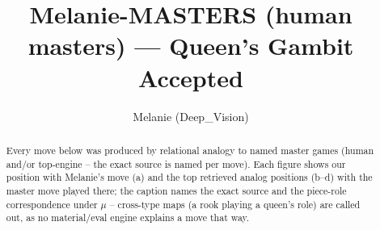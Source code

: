 \documentclass[11pt]{article}
\title{Melanie-MASTERS (human masters) — Queen's Gambit Accepted}
\author{Melanie (Deep\_Vision)}
\date{}
\begin{document}
\maketitle

\begin{abstract}Every move below was produced by relational analogy to named master games (human and/or top-engine -- the exact source is named per move). Each figure shows our position with Melanie's move (a) and the top retrieved analog positions (b--d) with the master move played there; the caption names the exact source and the piece-role correspondence under $\mu$ -- cross-type maps (a rook playing a queen's role) are called out, as no material/eval engine explains a move that way.\end{abstract}

\begin{figure}[p]\centering
\begin{subfigure}{0.46\textwidth}\centering
\resizebox{\linewidth}{!}{%
\newchessgame
\chessboard[
  setfen={rnbqkb1r/1p3ppp/p3pn2/2p5/2BP4/4PN2/PP3PPP/RNBQ1RK1 w kq - 0 7},
  showmover=false,
  pgfstyle=straightmove, color=movearrow, markmove={d4-c5}
]}
\caption{}
\end{subfigure}\hfill
\begin{subfigure}{0.46\textwidth}\centering
\resizebox{\linewidth}{!}{%
\newchessgame
\chessboard[
  setfen={rnbq1rk1/1pp1nppp/1b2p3/8/1p1PN3/P5P1/1BP1NPBP/R2QK2R w KQ - 0 11},
  showmover=false,
  pgfstyle=straightmove, color=movearrow, markmove={a3-b4}
]}
\caption{}
\end{subfigure}
\\[4pt]
\begin{subfigure}{0.46\textwidth}\centering
\resizebox{\linewidth}{!}{%
\newchessgame
\chessboard[
  setfen={rn1q1rk1/1b1pbppp/4pn2/p7/1P1P1P2/2N2NP1/1P2P1BP/R1BQ1RK1 b - - 0 11},
  showmover=false,
  pgfstyle=straightmove, color=movearrow, markmove={a5-b4}
]}
\caption{}
\end{subfigure}\hfill
\begin{subfigure}{0.46\textwidth}\centering
\resizebox{\linewidth}{!}{%
\newchessgame
\chessboard[
  setfen={rnbq1rk1/5ppp/p3pn2/1pp5/2BP4/P1P1PN2/5PPP/R1BQ1RK1 w - - 0 11},
  showmover=false,
  pgfstyle=straightmove, color=movearrow, markmove={c4-e2}
]}
\caption{}
\end{subfigure}

\end{figure}
\end{document}
